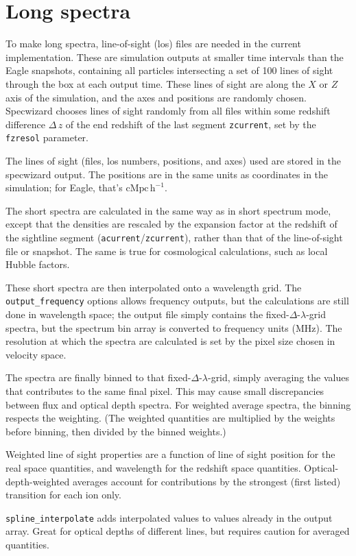 \documentclass{report}
\newcommand{\param}[1]{{\tt #1}}
\begin{document}
\section{Long spectra}
To make long spectra, line-of-sight (los) files are needed in the current implementation. These are simulation outputs at smaller time intervals than the Eagle snapshots, containing all particles intersecting a set of 100 lines of sight through the box at each output time. These lines of sight are along the $X$ or $Z$ axis of the simulation, and the axes and positions are randomly chosen. Specwizard chooses lines of sight randomly from all files within some redshift difference $\Delta \, z$ of the end redshift of the last segment \param{zcurrent}, set by the \param{fzresol} parameter.

The lines of sight (files, los numbers, positions, and axes) used are stored in the specwizard output. The positions are in the same units as coordinates in the simulation; for Eagle, that's $\mathrm{cMpc} \, \mathrm{h}^{-1}$.

The short spectra are calculated in the same way as in short spectrum mode, except that the densities are rescaled by the expansion factor at the redshift of the sightline segment (\param{acurrent}/\param{zcurrent}), rather than that of the line-of-sight file or snapshot. The same is true for cosmological calculations, such as local Hubble factors.

These short spectra are then interpolated onto a wavelength grid. The \param{output\_frequency} options allows frequency outputs, but the calculations are still done in wavelength space; the output file simply contains the fixed-$\Delta$-$\lambda$-grid spectra, but the spectrum bin array is converted to frequency units (MHz). The resolution at which the spectra are calculated is set by the pixel size chosen in velocity space.

The spectra are finally binned to that fixed-$\Delta$-$\lambda$-grid, simply averaging the values that contributes to the same final pixel. This may cause small discrepancies between flux and optical depth spectra. For weighted average spectra, the binning respects the weighting. (The weighted quantities are multiplied by the weights before binning, then divided by the binned weights.)

Weighted line of sight properties are a function of line of sight position for the real space quantities, and wavelength for the redshift space quantities. Optical-depth-weighted averages account for contributions by the strongest (first listed) transition for each ion only.

\param{spline\_interpolate} adds interpolated values to values already in the output array. Great for optical depths of different lines, but requires caution for averaged quantities.  
\end{document}

